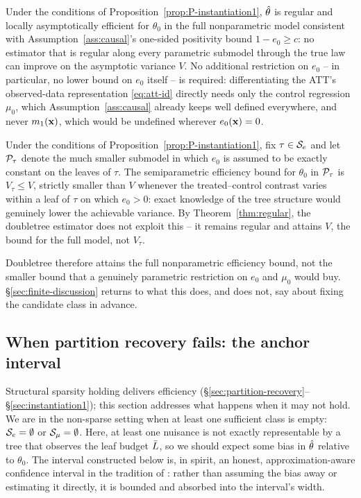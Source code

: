 \documentclass[12pt]{article}
\begin{document}
\begin{theorem}
\label{thm:regular}
Under the conditions of Proposition~\ref{prop:P-instantiation1}, $\hat{\theta}$
is regular and locally asymptotically efficient for $\theta_0$ in the full
nonparametric model consistent with Assumption~\ref{ass:causal}'s one-sided
positivity bound $1-e_0\ge c$: no estimator that is regular along every
parametric submodel through the true law can improve on the asymptotic
variance $V$. No additional restriction on $e_0$ -- in particular, no lower
bound on $e_0$ itself -- is required: differentiating the ATT's
observed-data representation \eqref{eq:att-id}
directly needs only the control regression $\mu_0$, which
Assumption~\ref{ass:causal} already keeps well defined everywhere, and never
$m_1(\mathbf{x})$, which would be undefined wherever $e_0(\mathbf{x})=0$.
\end{theorem}

\begin{proposition}
\label{prop:sparse-bound}
Under the conditions of Proposition~\ref{prop:P-instantiation1}, fix
$\tau\in\mathcal{S}_e$ and let $\mathcal{P}_\tau$ denote the much smaller submodel in which
$e_0$ is assumed to be exactly constant on the leaves of $\tau$. The
semiparametric efficiency bound for $\theta_0$ in $\mathcal{P}_\tau$ is $V_\tau\le
V$, strictly smaller than $V$ whenever the treated--control contrast varies
within a leaf of $\tau$ on which $e_0>0$: exact knowledge of the tree
structure would genuinely lower the achievable variance. By
Theorem~\ref{thm:regular}, the doubletree estimator does not exploit this --
it remains regular and attains $V$, the bound for the full model, not
$V_\tau$.
\end{proposition}

Doubletree therefore attains the full nonparametric efficiency bound, not the smaller bound that a genuinely parametric restriction on $e_0$ and $\mu_0$ would buy. \S\ref{sec:finite-discussion} returns to what this does, and does not, say about fixing the candidate class in advance.
\subsection{When partition recovery fails: the anchor interval}
\label{sec:honest-manuscript}
Structural sparsity holding delivers efficiency (\S\ref{sec:partition-recovery}--\S\ref{sec:instantiation1}); this section addresses what happens when it may not hold. We are in the non-sparse setting when at least one sufficient class is empty: $\mathcal{S}_e = \emptyset$ or $\mathcal{S}_\mu = \emptyset$. Here, at least one nuisance is not exactly representable by a tree that observes the leaf budget $\bar{L}$, so we should expect some bias in $\hat{\theta}$ relative to $\theta_0$. The interval constructed below is, in spirit, an honest, approximation-aware confidence interval in the tradition of \citet{armstrong2018}: rather than assuming the bias away or estimating it directly, it is bounded and absorbed into the interval's width.
\end{document}
